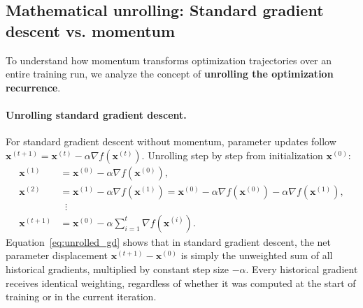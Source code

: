 \subsection{Mathematical unrolling: Standard gradient descent vs. momentum}
\label{sec:unrolling_gd_momentum}

To understand how momentum transforms optimization trajectories over an entire training run, we analyze the concept of \textbf{unrolling the optimization recurrence}.

\paragraph{Unrolling standard gradient descent.}
For standard gradient descent without momentum, parameter updates follow $\mathbf{x}^{(t+1)} = \mathbf{x}^{(t)} - \alpha \nabla f(\mathbf{x}^{(t)})$. Unrolling step by step from initialization $\mathbf{x}^{(0)}$:
\begin{align}
\mathbf{x}^{(1)} &= \mathbf{x}^{(0)} - \alpha \nabla f(\mathbf{x}^{(0)}), \nonumber \\
\mathbf{x}^{(2)} &= \mathbf{x}^{(1)} - \alpha \nabla f(\mathbf{x}^{(1)}) = \mathbf{x}^{(0)} - \alpha \nabla f(\mathbf{x}^{(0)}) - \alpha \nabla f(\mathbf{x}^{(1)}), \nonumber \\
&\;\;\vdots \nonumber \\
\mathbf{x}^{(t+1)} &= \mathbf{x}^{(0)} - \alpha \sum_{i=1}^t \nabla f(\mathbf{x}^{(i)}).
\label{eq:unrolled_gd}
\end{align}
Equation~\eqref{eq:unrolled_gd} shows that in standard gradient descent, the net parameter displacement $\mathbf{x}^{(t+1)} - \mathbf{x}^{(0)}$ is simply the unweighted sum of all historical gradients, multiplied by constant step size $-\alpha$. Every historical gradient receives identical weighting, regardless of whether it was computed at the start of training or in the current iteration.


